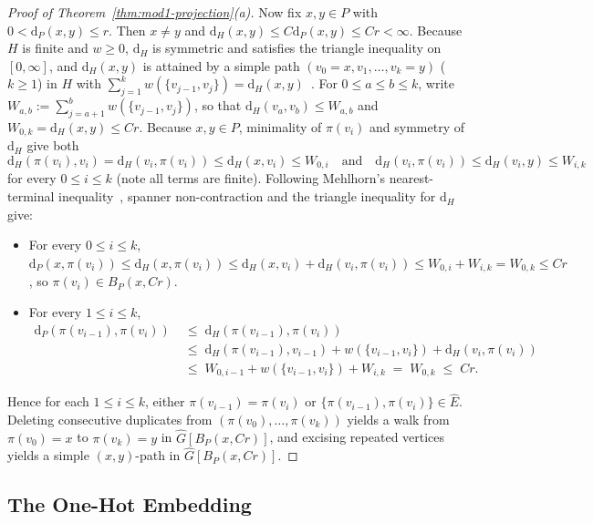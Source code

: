 \documentclass[11pt]{article}
\theoremstyle{definition}
\theoremstyle{remark}
\newcommand{\dH}{\mathrm{d}_H}
\newcommand{\dP}{\mathrm{d}_P}
\begin{document}
\begin{proof}[Proof of Theorem~\ref{thm:mod1-projection}(a)]
Now fix $x, y \in P$ with $0 < \dP(x, y) \le r$. Then $x \ne y$ and $\dH(x, y) \le C \dP(x, y) \le C r < \infty$. Because $H$ is finite and $w \ge 0$, $\dH$ is symmetric and satisfies the triangle inequality on $[0, \infty]$, and $\dH(x, y)$ is attained by a simple path $(v_0 = x, v_1, \dots, v_k = y)$ ($k \ge 1$) in $H$ with $\sum_{j=1}^k w(\{v_{j-1}, v_j\}) = \dH(x, y)$~\cite[Chapter~7]{schrijver2003combinatorial}. For $0 \le a \le b \le k$, write $W_{a, b} := \sum_{j=a+1}^b w(\{v_{j-1}, v_j\})$, so that $\dH(v_a, v_b) \le W_{a, b}$ and $W_{0, k} = \dH(x, y) \le C r$. Because $x, y \in P$, minimality of $\pi(v_i)$ and symmetry of $\dH$ give both
\[
\dH(\pi(v_i), v_i) = \dH(v_i, \pi(v_i)) \le \dH(x, v_i) \le W_{0, i}
\quad \text{and} \quad
\dH(v_i, \pi(v_i)) \le \dH(v_i, y) \le W_{i, k}
\]
for every $0 \le i \le k$ (note all terms are finite). Following Mehlhorn's nearest-terminal inequality~\cite{mehlhorn1988faster}, spanner non-contraction and the triangle inequality for $\dH$ give:
\begin{itemize}[leftmargin=2em,nosep]
  \item For every $0 \le i \le k$, $\dP(x, \pi(v_i)) \le \dH(x, \pi(v_i)) \le \dH(x, v_i) + \dH(v_i, \pi(v_i)) \le W_{0, i} + W_{i, k} = W_{0, k} \le C r$, so $\pi(v_i) \in B_P(x, C r)$.
  \item For every $1 \le i \le k$,
  \begin{align*}
  \dP(\pi(v_{i-1}), \pi(v_i)) &\;\le\; \dH(\pi(v_{i-1}), \pi(v_i)) \\
  &\;\le\; \dH(\pi(v_{i-1}), v_{i-1}) + w(\{v_{i-1}, v_i\}) + \dH(v_i, \pi(v_i)) \\
  &\;\le\; W_{0, i-1} + w(\{v_{i-1}, v_i\}) + W_{i, k} \;=\; W_{0, k} \;\le\; C r.
  \end{align*}
\end{itemize}
Hence for each $1 \le i \le k$, either $\pi(v_{i-1}) = \pi(v_i)$ or $\{\pi(v_{i-1}), \pi(v_i)\} \in \widehat{E}$. Deleting consecutive duplicates from $(\pi(v_0), \dots, \pi(v_k))$ yields a walk from $\pi(v_0) = x$ to $\pi(v_k) = y$ in $\widehat{G}[B_P(x, C r)]$, and excising repeated vertices yields a simple $(x, y)$-path in $\widehat{G}[B_P(x, C r)]$.
\end{proof}

\subsection{The One-Hot Embedding}
\label{subsec:onehot}
\end{document}
